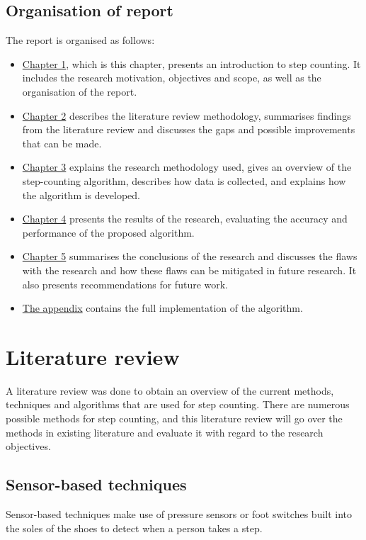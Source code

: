 \documentclass[12pt]{report}
\begin{document}
\section{Organisation of report}
\label{sec:orgab09c41}
The report is organised as follows:
\begin{itemize}
\item \hyperref[orgadb9a1a]{Chapter 1}, which is this chapter, presents an introduction to step
counting. It includes the research motivation, objectives and scope,
as well as the organisation of the report.
\item \hyperref[org3569a14]{Chapter 2} describes the literature review methodology,
summarises findings from the literature review and discusses
the gaps and possible improvements that can be made.
\item \hyperref[orga74852e]{Chapter 3} explains the research methodology used,
gives an overview of the step-counting algorithm,
describes how data is collected,
and explains how the algorithm is developed.
\item \hyperref[orgb796370]{Chapter 4} presents the results of the research,
evaluating the accuracy and performance of the proposed algorithm.
\item \hyperref[orgfc370b4]{Chapter 5} summarises the conclusions of the research and discusses
the flaws with the research and how these flaws can be mitigated
in future research. It also presents recommendations for future work.
\item \hyperref[orgf85d410]{The appendix} contains the full implementation of the algorithm.
\end{itemize}
\chapter{Literature review}
\label{sec:org31bd0f0}
\label{org3569a14}
A literature review was done to obtain an overview of the current
methods, techniques and algorithms that are used for step counting.
There are numerous possible methods for step counting, and this
literature review will go over the methods in existing literature
and evaluate it with regard to the research objectives.
\section{Sensor-based techniques}
\label{sec:org66b1215}
Sensor-based techniques make use of pressure sensors or
foot switches built into the soles of the shoes to detect
when a person takes a step.
\end{document}
